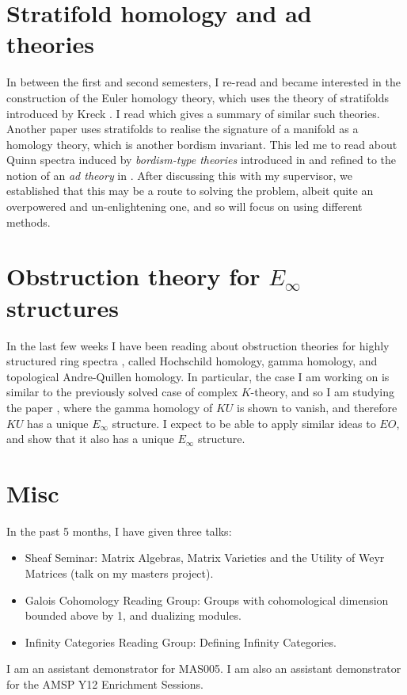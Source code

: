 \documentclass{amsart}
\begin{document}
\section{Stratifold homology and ad theories}
In between the first and second semesters, I re-read \cite{weber} and became interested in the construction of the Euler homology theory, which uses the theory of stratifolds introduced by Kreck \cite{kreck-diff-alg-top}.
I read \cite{kreck-zoo} which gives a summary of similar such theories.
Another paper \cite{minatta} uses stratifolds to realise the signature of a manifold as a homology theory, which is another bordism invariant.
This led me to read about Quinn spectra induced by \textit{bordism-type theories} introduced in \cite{quinn} and refined to the notion of an \textit{ad theory} in \cite{laures-mcclure-mult, laures-mcclure-comm}.
After discussing this with my supervisor, we established that this may be a route to solving the problem, albeit quite an overpowered and un-enlightening one, and so will focus on using different methods.

\section{Obstruction theory for $E_\infty$ structures}
In the last few weeks I have been reading about obstruction theories for highly structured ring spectra \cite{structured-ring-spectra}, called Hochschild homology, gamma homology, and topological Andre-Quillen homology.
In particular, the case I am working on is similar to the previously solved case of complex $K$-theory, and so I am studying the paper \cite{baker-richter}, where the gamma homology of $KU$ is shown to vanish, and therefore $KU$ has a unique $E_\infty$ structure.
I expect to be able to apply similar ideas to $EO$, and show that it also has a unique $E_\infty$ structure.

\section{Misc}
In the past 5 months, I have given three talks:
\begin{itemize}
    \item Sheaf Seminar: Matrix Algebras, Matrix Varieties and the Utility of Weyr Matrices (talk on my masters project).
    \item Galois Cohomology Reading Group: Groups with cohomological dimension bounded above by 1, and dualizing modules.
    \item Infinity Categories Reading Group: Defining Infinity Categories.
\end{itemize}
I am an assistant demonstrator for MAS005. I am also an assistant demonstrator for the AMSP Y12 Enrichment Sessions.



\end{document}
